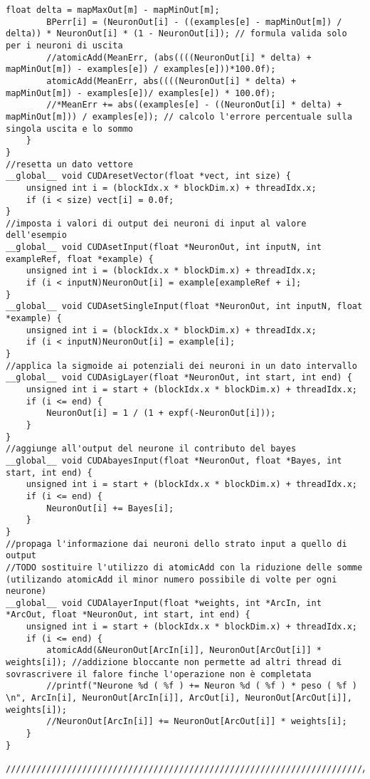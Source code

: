 \documentclass[10pt,a4paper]{article}
\begin{document}
\begin{lstlisting}[style=mycuda, caption=cuda kernels, captionpos=b]
		float delta = mapMaxOut[m] - mapMinOut[m];
		BPerr[i] = (NeuronOut[i] - ((examples[e] - mapMinOut[m]) / delta)) * NeuronOut[i] * (1 - NeuronOut[i]); // formula valida solo per i neuroni di uscita
		//atomicAdd(MeanErr, (abs((((NeuronOut[i] * delta) + mapMinOut[m]) - examples[e]) / examples[e]))*100.0f);
		atomicAdd(MeanErr, abs((((NeuronOut[i] * delta) + mapMinOut[m]) - examples[e])/ examples[e]) * 100.0f);
		//*MeanErr += abs((examples[e] - ((NeuronOut[i] * delta) + mapMinOut[m])) / examples[e]); // calcolo l'errore percentuale sulla singola uscita e lo sommo 
	}
}
//resetta un dato vettore 
__global__ void CUDAresetVector(float *vect, int size) {
	unsigned int i = (blockIdx.x * blockDim.x) + threadIdx.x;
	if (i < size) vect[i] = 0.0f;
}
//imposta i valori di output dei neuroni di input al valore dell'esempio
__global__ void CUDAsetInput(float *NeuronOut, int inputN, int exampleRef, float *example) {
	unsigned int i = (blockIdx.x * blockDim.x) + threadIdx.x;
	if (i < inputN)NeuronOut[i] = example[exampleRef + i];
}
__global__ void CUDAsetSingleInput(float *NeuronOut, int inputN, float *example) {
	unsigned int i = (blockIdx.x * blockDim.x) + threadIdx.x;
	if (i < inputN)NeuronOut[i] = example[i];
}
//applica la sigmoide ai potenziali dei neuroni in un dato intervallo
__global__ void CUDAsigLayer(float *NeuronOut, int start, int end) {
	unsigned int i = start + (blockIdx.x * blockDim.x) + threadIdx.x;
	if (i <= end) {
		NeuronOut[i] = 1 / (1 + expf(-NeuronOut[i]));
	}
}
//aggiunge all'output del neurone il contributo del bayes
__global__ void CUDAbayesInput(float *NeuronOut, float *Bayes, int start, int end) {
	unsigned int i = start + (blockIdx.x * blockDim.x) + threadIdx.x;
	if (i <= end) {
		NeuronOut[i] += Bayes[i];
	}
}
//propaga l'informazione dai neuroni dello strato input a quello di output
//TODO sostituire l'utilizzo di atomicAdd con la riduzione delle somme (utilizando atomicAdd il minor numero possibile di volte per ogni neurone)
__global__ void CUDAlayerInput(float *weights, int *ArcIn, int *ArcOut, float *NeuronOut, int start, int end) {
	unsigned int i = start + (blockIdx.x * blockDim.x) + threadIdx.x;
	if (i <= end) {
		atomicAdd(&NeuronOut[ArcIn[i]], NeuronOut[ArcOut[i]] * weights[i]); //addizione bloccante non permette ad altri thread di sovrascrivere il falore finche l'operazione non è completata
		//printf("Neurone %d ( %f ) += Neuron %d ( %f ) * peso ( %f ) \n", ArcIn[i], NeuronOut[ArcIn[i]], ArcOut[i], NeuronOut[ArcOut[i]], weights[i]);
		//NeuronOut[ArcIn[i]] += NeuronOut[ArcOut[i]] * weights[i];
	}
}

//////////////////////////////////////////////////////////////////////////////////////

\end{lstlisting}
\end{document}
